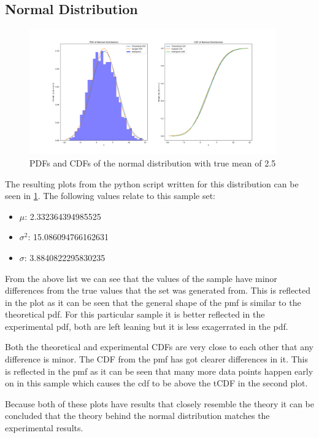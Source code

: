 \documentclass[a4paper, 12pt]{article}
\begin{document}
        \subsection{Normal Distribution} \label{sec:normalExp}
            \begin{figure}[!h]
                \centering
                \includegraphics[width=0.95\textwidth]{normal.png}
                \caption{PDFs and CDFs of the normal distribution with true mean of 2.5}
                \label{fig:normal}
            \end{figure}

            The resulting plots from the python script written for this distribution can be seen in \cref{fig:normal}. The following values relate to this sample set:
            \begin{itemize}
                \item $\mu$: 2.332364394985525
                \item $\sigma^2$: 15.086094766162631
                \item $\sigma$: 3.8840822295830235
            \end{itemize}
            From the above list we can see that the values of the sample have minor differences from the true values that the set was generated from. This is reflected in the plot as it can be seen that the general shape of the pmf is similar to the theoretical pdf. For this particular sample it is better reflected in the experimental pdf, both are left leaning but it is less exagerrated in the pdf.
            \par
            Both the theoretical and experimental CDFs are very close to each other that any difference is minor. The CDF from the pmf has got clearer differences in it. This is reflected in the pmf as it can be seen that many more data points happen early on in this sample which causes the cdf to be above the tCDF in the second plot. 
            \par
            Because both of these plots have results that closely resemble the theory it can be concluded that the theory behind the normal distribution matches the experimental results.
\end{document}
